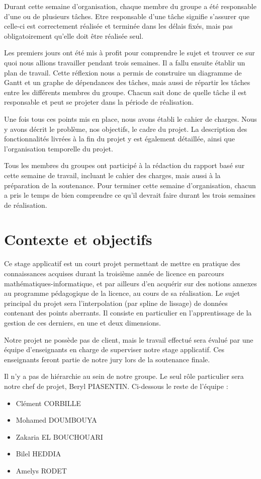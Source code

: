\documentclass[a4paper,12pt]{article} %
\begin{document}
Durant cette semaine d'organisation, chaque membre du groupe a été responsable d’une ou de plusieurs tâches. Etre responsable d'une tâche signifie s'assurer que celle-ci est correctement réalisée et terminée dans les délais fixés, mais pas obligatoirement qu'elle doit être réalisée seul.

Les premiers jours ont été mis à profit pour comprendre le sujet et trouver ce sur quoi nous allions travailler pendant trois semaines. Il a fallu ensuite établir un plan de travail. Cette réflexion nous a permis de construire un diagramme de Gantt et un graphe de dépendances des tâches, mais aussi de répartir les tâches entre les différents membres du groupe. Chacun sait donc de quelle tâche il est responsable et peut se projeter dans la période de réalisation.

Une fois tous ces points mis en place, nous avons établi le cahier de charges. Nous y avons décrit le problème, nos objectifs, le cadre du projet. La description des fonctionnalités livrées à la fin du projet y est également détaillée, ainsi que l'organisation temporelle du projet. 

Tous les membres du groupes ont participé à la rédaction du rapport basé sur cette semaine de travail, incluant le cahier des charges, mais aussi à la préparation de la soutenance. Pour terminer cette semaine d'organisation, chacun a pris le temps de bien comprendre ce qu'il devrait faire durant les trois semaines de réalisation. 


\newpage
\section{Contexte et objectifs}
Ce stage applicatif est un court projet permettant de mettre en pratique des connaissances acquises durant la troisième année de licence en parcours mathématiques-informatique, et par ailleurs d’en acquérir sur des notions annexes au programme pédagogique de la licence, au cours de sa réalisation. Le sujet principal du projet sera l’interpolation (par spline de lissage) de données contenant des points aberrants. Il consiste en particulier en l'apprentissage de la gestion de ces derniers, en une et deux dimensions.

Notre projet ne possède pas de client, mais le  travail effectué sera évalué par une équipe d’enseignants en charge de superviser notre stage applicatif. Ces enseignants feront partie de notre jury lors de la soutenance finale. 

Il n'y a pas de hiérarchie au sein de notre groupe. Le seul rôle particulier sera notre chef de projet, Beryl PIASENTIN. Ci-dessous le reste de l’équipe :
\begin{itemize}
\item Clément CORBILLE 
\item Mohamed DOUMBOUYA
\item Zakaria EL BOUCHOUARI
\item Bilel HEDDIA
\item Amelys RODET
\end{itemize}
\end{document}
